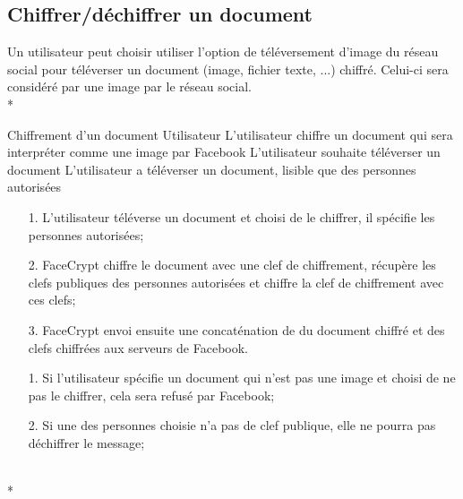 \documentclass[a4paper,11pt,french]{article}
\begin{document}
\subsection{Chiffrer/déchiffrer un document}
Un utilisateur peut choisir utiliser l'option de téléversement
d'image du réseau social pour téléverser un document (image, 
fichier texte, ...) chiffré. Celui-ci sera considéré par une image
par le réseau social.\\*

\fiche
	{Chiffrement d'un document}
	{Utilisateur}
	{L'utilisateur chiffre un document qui sera interpréter comme une image 
        par Facebook}
	{}
	{L'utilisateur souhaite téléverser un document}
	{L'utilisateur a téléverser un document, lisible que des personnes 
        autorisées}
	{\begin{itemize}
	    \item[]
	  \item[1.] L'utilisateur téléverse un document et choisi de le chiffrer,
          il spécifie les personnes autorisées;
	\end{itemize}
	}
	{\begin{itemize}
        \item[]
		\item[2.] FaceCrypt chiffre le document avec une clef 
        de chiffrement, récupère les clefs publiques
        des personnes autorisées et chiffre la clef de chiffrement
        avec ces clefs;
		\item[3.] FaceCrypt envoi ensuite une concaténation de 
        du document chiffré et des clefs chiffrées aux serveurs de Facebook.
	\end{itemize}
	}
	{}
\flots
    {\begin{itemize}
    \item[]
    \item[1.] Si l'utilisateur spécifie un document qui n'est pas une image
    et choisi de ne pas le chiffrer, cela sera refusé par Facebook;
    \item[2.] Si une des personnes choisie n'a pas de clef publique,
        elle ne pourra pas déchiffrer le message;
    \end{itemize}
    }
	{}    
\\*
\end{document}
